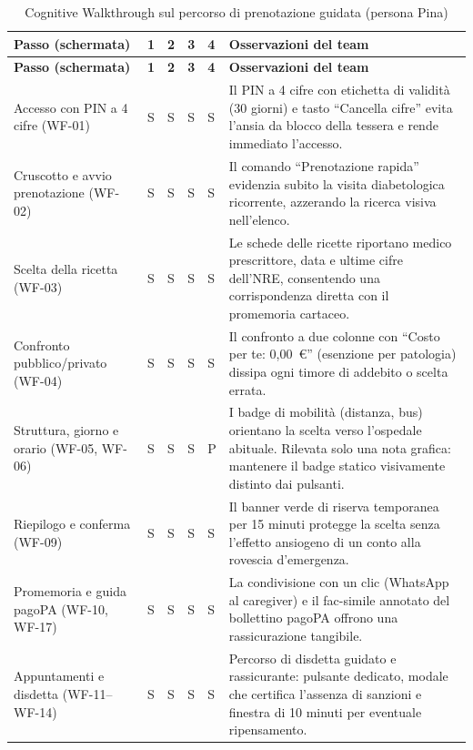 \begin{center}
\footnotesize
\begin{longtable}{@{}
  >{\raggedright\arraybackslash}p{}
  >{\centering\arraybackslash}p{}
  >{\centering\arraybackslash}p{}
  >{\centering\arraybackslash}p{}
  >{\centering\arraybackslash}p{}
  >{\raggedright\arraybackslash}p{}@{}}
\caption{Cognitive Walkthrough sul percorso di prenotazione guidata (persona Pina)}\label{tab:d-cw}\\
\toprule
\textbf{Passo (schermata)} & \textbf{1} & \textbf{2} & \textbf{3} & \textbf{4} & \textbf{Osservazioni del team} \\
\midrule
\endfirsthead
\toprule
\textbf{Passo (schermata)} & \textbf{1} & \textbf{2} & \textbf{3} & \textbf{4} & \textbf{Osservazioni del team} \\
\midrule
\endhead
\bottomrule
\endlastfoot
Accesso con PIN a 4 cifre (WF-01) & S & S & S & S & Il PIN a 4 cifre con etichetta di validità (30 giorni) e tasto ``Cancella cifre'' evita l'ansia da blocco della tessera e rende immediato l'accesso. \\
\addlinespace
Cruscotto e avvio prenotazione (WF-02) & S & S & S & S & Il comando ``Prenotazione rapida'' evidenzia subito la visita diabetologica ricorrente, azzerando la ricerca visiva nell'elenco. \\
\addlinespace
Scelta della ricetta (WF-03) & S & S & S & S & Le schede delle ricette riportano medico prescrittore, data e ultime cifre dell'NRE, consentendo una corrispondenza diretta con il promemoria cartaceo. \\
\addlinespace
Confronto pubblico/privato (WF-04) & S & S & S & S & Il confronto a due colonne con ``Costo per te: 0,00~€'' (esenzione per patologia) dissipa ogni timore di addebito o scelta errata. \\
\addlinespace
Struttura, giorno e orario (WF-05, WF-06) & S & S & S & P & I badge di mobilità (distanza, bus) orientano la scelta verso l'ospedale abituale. Rilevata solo una nota grafica: mantenere il badge statico visivamente distinto dai pulsanti. \\
\addlinespace
Riepilogo e conferma (WF-09) & S & S & S & S & Il banner verde di riserva temporanea per 15 minuti protegge la scelta senza l'effetto ansiogeno di un conto alla rovescia d'emergenza. \\
\addlinespace
Promemoria e guida pagoPA (WF-10, WF-17) & S & S & S & S & La condivisione con un clic (WhatsApp al caregiver) e il fac-simile annotato del bollettino pagoPA offrono una rassicurazione tangibile. \\
\addlinespace
Appuntamenti e disdetta (WF-11--WF-14) & S & S & S & S & Percorso di disdetta guidato e rassicurante: pulsante dedicato, modale che certifica l'assenza di sanzioni e finestra di 10 minuti per eventuale ripensamento. \\
\end{longtable}
\end{center}

